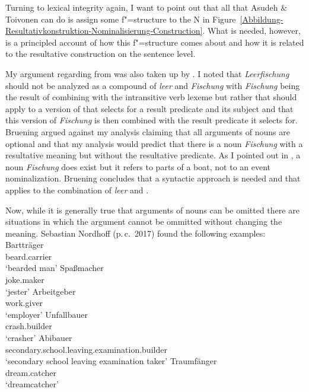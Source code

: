 Turning to lexical integrity again, I want to point out that all that Asudeh \& Toivonen can do is
assign some f"=structure to the N in
Figure~\ref{Abbildung-Resultativkonstruktion-Nominalisierung-Construction}. What is needed, however,
is a principled account of how this f"=structure comes about and how it is related to the
resultative construction on the sentence level.

\largerpage[2]
My argument regarding \ungn from  was also taken up by
\citet{Bruening2018a}. I noted that \emph{Leerfischung} should not be analyzed as a compound of
\emph{leer} and \emph{Fischung} with \emph{Fischung} being the result of combining \ung with the
intransitive verb lexeme  but rather that \ung should apply to a
version of  that selects for a result predicate and its subject and that this version of
\emph{Fischung} is then combined with the result predicate it selects for. Bruening argued against
my analysis claiming that all arguments of nouns are optional and that my analysis would predict
that there is a noun \emph{Fischung} with a resultative meaning but without the resultative
predicate. As I pointed out in \citet[]{Mueller2006d}, a noun \emph{Fischung} does exist but it
refers to parts of a boat, not to an event nominalization. Bruening concludes that a syntactic
approach is needed and that \ung applies to the combination of \emph{leer} and .


Now, while it is generally true that arguments of nouns can be omitted there are situations in which
the argument cannot be ommitted without changing the meaning. Sebastian Nordhoff
(p.\,c.\ 2017) found the following examples:
\eal
\ex
\gll Bartträger\\
    beard.carrier\\
\glt `bearded man'
\ex 
\gll Spaßmacher\\
     joke.maker\\
\glt `jester'
\ex 
\gll Arbeitgeber\\
     work.giver\\
\glt `employer'
\ex 
\gll Unfallbauer\\
    crash.builder\\
\glt `crasher'
\ex 
\gll Abibauer\\
     secondary.school.leaving.examination.builder\\
\glt `secondary school leaving examination taker'
\ex 
\gll Traumfänger\\
     dream.catcher\\
\glt `dreamcatcher'

